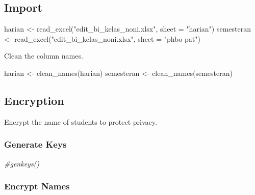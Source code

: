 \documentclass[
]{article}
\newenvironment{Shaded}{\begin{snugshade}}{\end{snugshade}}
\newcommand{\AttributeTok}[1]{\textcolor[rgb]{0.77,0.63,0.00}{#1}}
\newcommand{\CommentTok}[1]{\textcolor[rgb]{0.56,0.35,0.01}{\textit{#1}}}
\newcommand{\FunctionTok}[1]{\textcolor[rgb]{0.00,0.00,0.00}{#1}}
\newcommand{\NormalTok}[1]{#1}
\newcommand{\OtherTok}[1]{\textcolor[rgb]{0.56,0.35,0.01}{#1}}
\newcommand{\StringTok}[1]{\textcolor[rgb]{0.31,0.60,0.02}{#1}}
\begin{document}
\hypertarget{import}{%
\subsection{Import}\label{import}}

\begin{Shaded}
\begin{Highlighting}[]
\NormalTok{harian }\OtherTok{\textless{}{-}} \FunctionTok{read\_excel}\NormalTok{(}\StringTok{"edit\_bi\_kelas\_noni.xlsx"}\NormalTok{, }
    \AttributeTok{sheet =} \StringTok{"harian"}\NormalTok{)}
\NormalTok{semesteran }\OtherTok{\textless{}{-}} \FunctionTok{read\_excel}\NormalTok{(}\StringTok{"edit\_bi\_kelas\_noni.xlsx"}\NormalTok{, }
    \AttributeTok{sheet =} \StringTok{"phbo pat"}\NormalTok{)}
\end{Highlighting}
\end{Shaded}

Clean the column names.

\begin{Shaded}
\begin{Highlighting}[]
\NormalTok{harian }\OtherTok{\textless{}{-}} \FunctionTok{clean\_names}\NormalTok{(harian)}
\NormalTok{semesteran }\OtherTok{\textless{}{-}} \FunctionTok{clean\_names}\NormalTok{(semesteran)}
\end{Highlighting}
\end{Shaded}

\hypertarget{encryption}{%
\subsection{Encryption}\label{encryption}}

Encrypt the name of students to protect privacy.

\hypertarget{generate-keys}{%
\subsubsection{Generate Keys}\label{generate-keys}}

\begin{Shaded}
\begin{Highlighting}[]
\CommentTok{\#genkeys()}
\end{Highlighting}
\end{Shaded}

\hypertarget{encrypt-names}{%
\subsubsection{Encrypt Names}\label{encrypt-names}}
\end{document}
